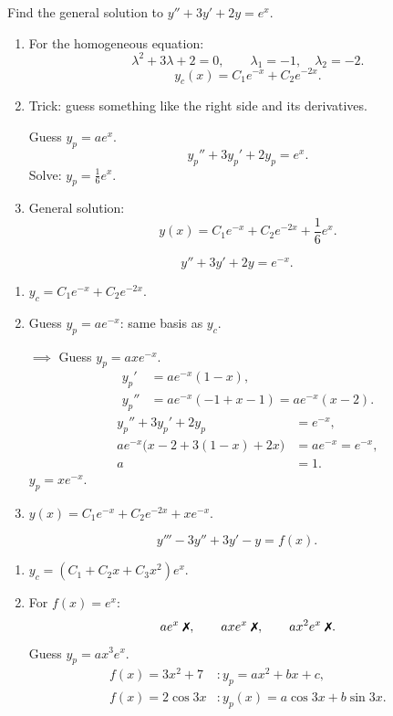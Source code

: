 \begin{example}
  Find the general solution to $y''+3y'+2y=e^x$.
  \begin{enumerate}
    \item For the homogeneous equation:
          \[
            \lambda^2+3\lambda+2=0,\qquad\lambda_1=-1,\quad\lambda_2=-2.
          \]
          \[
            y_c(x)=C_1e^{-x}+C_2e^{-2x}.
          \]
    \item Trick: guess something like the right side and its derivatives.

          Guess $y_p=ae^x$.
          \[
            y_p''+3y_p'+2y_p=e^x.
          \]
          Solve: $y_p=\frac16e^x$.
    \item General solution:
          \[
            y(x)=C_1e^{-x}+C_2e^{-2x}+\frac16e^x.
          \]
  \end{enumerate}
\end{example}

\begin{example}
  \[
    y''+3y'+2y=e^{-x}.
  \]
  \begin{enumerate}
    \item $y_c=C_1e^{-x}+C_2e^{-2x}$.
    \item Guess $y_p=ae^{-x}$: same basis as $y_c$.

          $\implies$ Guess $y_p=axe^{-x}$.
          \begin{align*}
            y_p'  & =ae^{-x}(1-x),                 \\
            y_p'' & =ae^{-x}(-1+x-1)=ae^{-x}(x-2).
          \end{align*}
          \begin{align*}
            y_p''+3y_p'+2y_p                 & =e^{-x},         \\
            ae^{-x}\bigl(x-2+3(1-x)+2x\bigr) & =ae^{-x}=e^{-x}, \\
            a                                & =1.
          \end{align*}
          $y_p=xe^{-x}$.
    \item $y(x)=C_1e^{-x}+C_2e^{-2x}+xe^{-x}$.
  \end{enumerate}
\end{example}

\begin{example}
  \[
    y'''-3y''+3y'-y=f(x).
  \]
  \begin{enumerate}
    \item $y_c=(C_1+C_2x+C_3x^2)e^x$.
    \item For $f(x)=e^x$:
          \[
            ae^x\;\text{\xmark},\qquad axe^x\;\text{\xmark},\qquad
            ax^2e^x\;\text{\xmark}.
          \]
          Guess $y_p=ax^3e^x$.
          \[
            \begin{array}{ll}
              f(x)=3x^2+7  & : y_p=ax^2+bx+c,          \\[4pt]
              f(x)=2\cos3x & : y_p(x)=a\cos3x+b\sin3x.
            \end{array}
          \]
  \end{enumerate}
\end{example}

